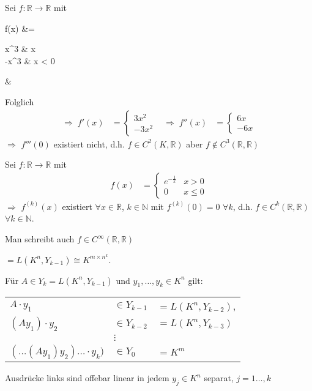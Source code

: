 \begin{example}
	Sei $f:\mathbb{R}\to\mathbb{R}$ mit \begin{flalign*}
		f(x) &= \begin{cases}
			x^3 & x \\
			-x^3 & x < 0
		\end{cases} &
	\end{flalign*}
	Folglich
	\begin{align*}
		\Rightarrow\; f'(x) &= \begin{cases}
			3x^2 \\ -3x^2
		\end{cases} & \Rightarrow \; f''(x) &= \begin{cases}
			6x \\ -6x
		\end{cases}
	\end{align*}
	$\Rightarrow$ $f'''(0)$ existiert nicht, d.h. $f\in C^2(K, \mathbb{R})$ aber $f\notin C^3(\mathbb{R},\mathbb{R})$
\end{example}

\begin{example}
	Sei $f:\mathbb{R}\to\mathbb{R}$ mit \begin{align*}
		f(x) &= \begin{cases}
			e^{-\frac{1}{x}} & x > 0 \\
			0 & x\le 0
		\end{cases}
	\end{align*}
	$\Rightarrow$ $f^{(k)}(x)$ existiert $\forall x\in\mathbb{R}$, $k\in\mathbb{N}$ mit $f^{(k)}(0) = 0$ $\forall k$, d.h. $f\in C^k(\mathbb{R},\mathbb{R})$ $\forall k\in \mathbb{N}$.
	
	Man schreibt auch $f\in C^\infty(\mathbb{R},\mathbb{R})$
\end{example}

\begin{underlinedenvironment}[Räume $Y_k$] $=L(K^n, Y_{k-1}) \cong K^{m\times n^k}$.

Für $A\in Y_k = L(K^n, Y_{k-1})$ und $y_1, \dotsc, y_k\in K^n$ gilt:

\begin{tabularx}{\linewidth}{l@{$\,$}l@{$\,$}X}
$A\cdot y_1$ & $\in Y_{k-1}$ & $= L(K^n, Y_{k-2})$,\\
$(A y_1)\cdot y_2$ & $\in Y_{k-2}$ & $ = L(K^n, Y_{k-3})$ \\
& $\vdots$ & \\
$(\dotsc (A y_1) y_2) \dotsc \cdot y_k)$ & $ \in Y_0$ & $ = K^m$
\end{tabularx}

Ausdrücke links sind offebar linear in jedem $y_j\in K^n$ separat, $j=1\dotsc,k$
\end{underlinedenvironment}

